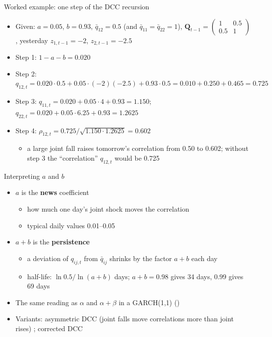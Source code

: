 \begin{frame}{Worked example: one step of the DCC recursion}
\itemsize{\footnotesize}
\begin{itemize}
    \item Given: $a = 0.05$, $b = 0.93$, $\bar q_{12} = 0.5$ (and $\bar q_{11} = \bar q_{22} = 1$), $\mathbf{Q}_{t-1} = \begin{pmatrix}1 & 0.5\\ 0.5 & 1\end{pmatrix}$, yesterday $z_{1,t-1} = -2$, $z_{2,t-1} = -2.5$
    \item Step 1: $1 - a - b = 0.020$
    \item Step 2: $q_{12,t} = 0.020 \cdot 0.5 + 0.05 \cdot (-2)(-2.5) + 0.93 \cdot 0.5 = 0.010 + 0.250 + 0.465 = 0.725$
    \item Step 3: $q_{11,t} = 0.020 + 0.05 \cdot 4 + 0.93 = 1.150$; \quad $q_{22,t} = 0.020 + 0.05 \cdot 6.25 + 0.93 = 1.2625$
    \item Step 4: $\rho_{12,t} = 0.725/\sqrt{1.150 \cdot 1.2625} = 0.602$
    \begin{itemize}
        \item a large joint fall raises tomorrow's correlation from 0.50 to 0.602; without step 3 the ``correlation'' $q_{12,t}$ would be 0.725
    \end{itemize}
\end{itemize}
\end{frame}

\begin{frame}{Interpreting $a$ and $b$}
\itemsize{\small}
\begin{itemize}
    \item $a$ is the \textbf{news} coefficient
    \begin{itemize}
        \item how much one day's joint shock moves the correlation
        \item typical daily values 0.01--0.05
    \end{itemize}
    \item $a + b$ is the \textbf{persistence}
    \begin{itemize}
        \item a deviation of $q_{ij,t}$ from $\bar q_{ij}$ shrinks by the factor $a + b$ each day
        \item half-life: $\ln 0.5/\ln(a + b)$ days; $a + b = 0.98$ gives 34 days, $0.99$ gives 69 days
    \end{itemize}
    \item The same reading as $\alpha$ and $\alpha + \beta$ in a GARCH(1,1) ()
    \item Variants: asymmetric DCC (joint falls move correlations more than joint rises) ; corrected DCC 
\end{itemize}
\end{frame}

